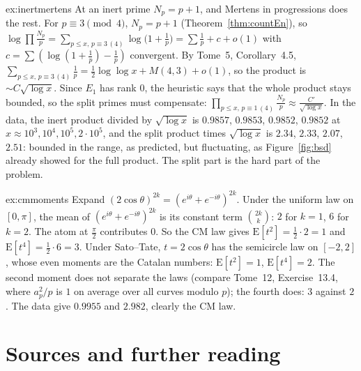 \begin{solution}{ex:inertmertens}
\idea At an inert prime $N_p=p+1$, and Mertens in progressions does the rest.
\writeup For $p\equiv3\pmod4$, $N_p=p+1$ (Theorem~\ref{thm:countEn}), so $\log\prod\frac{N_p}p=\sum_{p\le x,\,p\equiv3\,(4)}\log\bigl(1+\frac1p\bigr)
=\sum\frac1p+c+o(1)$ with $c=\sum(\log(1+\frac1p)-\frac1p)$ convergent. By Tome~5, Corollary~4.5, $\sum_{p\le x,\,p\equiv3\,(4)}\frac1p=\frac12\log\log x+M(4,3)+o(1)$,
so the product is $\sim C\sqrt{\log x}$. Since $E_1$ has rank $0$, the heuristic says that the whole product stays bounded, so the split primes must
compensate: $\prod_{p\le x,\,p\equiv1\,(4)}\frac{N_p}p\approx\frac{C'}{\sqrt{\log x}}$. In the data, the inert product divided by $\sqrt{\log x}$ is $0.9857$,
$0.9853$, $0.9852$, $0.9852$ at $x\approx10^3,10^4,10^5,2\cdot10^5$, and the split product times $\sqrt{\log x}$ is $2.34$, $2.33$, $2.07$, $2.51$: bounded
in the range, as predicted, but fluctuating, as Figure~\ref{fig:bsd} already showed for the full product. The split part is the hard part of the problem.
\end{solution}

\begin{solution}{ex:cmmoments}
\idea Expand $(2\cos\theta)^{2k}=(e^{i\theta}+e^{-i\theta})^{2k}$.
\writeup Under the uniform law on $[0,\pi]$, the mean of $(e^{i\theta}+e^{-i\theta})^{2k}$ is its constant term $\binom{2k}k$: $2$ for $k=1$, $6$ for $k=2$. The
atom at $\frac\pi2$ contributes $0$. So the CM law gives $\mathrm E[t^2]=\frac12\cdot2=1$ and $\mathrm E[t^4]=\frac12\cdot6=3$. Under Sato--Tate, $t=2\cos\theta$ has
the semicircle law on $[-2,2]$, whose even moments are the Catalan numbers: $\mathrm E[t^2]=1$, $\mathrm E[t^4]=2$. The second moment does not separate the
laws (compare Tome~12, Exercise~13.4, where $a_p^2/p$ is $1$ on average over all curves modulo $p$); the fourth does: $3$ against $2$. The data give $0.9955$ and $2.982$, clearly the CM law.
\end{solution}

\section*{Sources and further reading}

